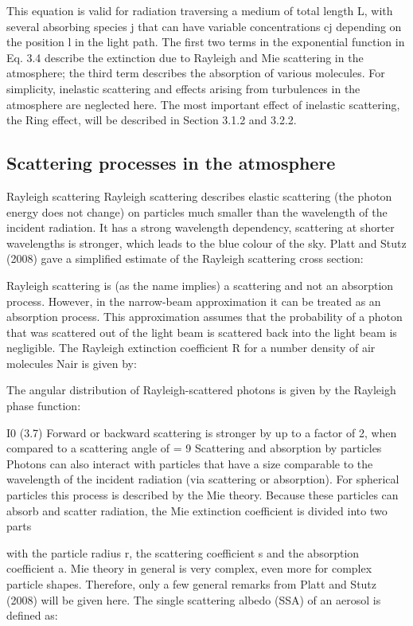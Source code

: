 \documentclass  [
  paper    = a4,
  BCOR     = 10mm,
  twoside,
  fontsize = 12pt,
  fleqn,
  toc      = bibnumbered,
  toc      = listofnumbered,
  numbers  = noendperiod,
  headings = normal,
  listof   = leveldown,
  version  = 3.03
]                                       {scrreprt}
\begin{document}
	This equation is valid for radiation traversing a medium of total length L, with
	several absorbing species j that can have variable concentrations cj depending
	on the position l in the light path. The first two terms in the exponential
	function in Eq. 3.4 describe the extinction due to Rayleigh and Mie scattering in
	the atmosphere; the third term describes the absorption of various molecules.
	For simplicity, inelastic scattering and effects arising from turbulences in the
	atmosphere are neglected here. The most important effect of inelastic scattering,
	the Ring effect, will be described in Section 3.1.2 and 3.2.2.
	\subsection{Scattering processes in the atmosphere}
Rayleigh scattering
Rayleigh scattering describes elastic scattering (the photon energy does not
change) on particles much smaller than the wavelength of the incident radiation.
It has a strong wavelength dependency, scattering at shorter wavelengths is
stronger, which leads to the blue colour of the sky. Platt and Stutz (2008) gave
a simplified estimate of the Rayleigh scattering cross section:

Rayleigh scattering is (as the name implies) a scattering and not an absorption
process. However, in the narrow-beam approximation it can be treated as an
absorption process. This approximation assumes that the probability of a photon
that was scattered out of the light beam is scattered back into the light beam
is negligible. The Rayleigh extinction coefficient R for a number density of air
molecules Nair is given by:

The angular distribution of Rayleigh-scattered photons is given by the Rayleigh
phase function:

I0
(3.7)
Forward or backward scattering is stronger by up to a factor of 2, when
compared to a scattering angle of  = 9
Scattering and absorption by particles
Photons can also interact with particles that have a size comparable to the
wavelength of the incident radiation (via scattering or absorption). For spherical
particles this process is described by the Mie theory. Because these particles can
absorb and scatter radiation, the Mie extinction coefficient is divided into two
parts

with the particle radius r, the scattering coefficient s and the absorption
coefficient a. Mie theory in general is very complex, even more for complex
particle shapes. Therefore, only a few general remarks from Platt and Stutz
(2008) will be given here.
The single scattering albedo (SSA) of an aerosol is defined as:
\end{document}
